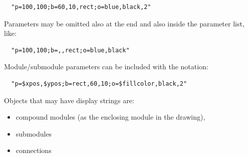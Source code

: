 \begin{verbatim}
  "p=100,100;b=60,10,rect;o=blue,black,2"
\end{verbatim}

Parameters may be omitted also at the end and also inside the
parameter list, like:

\begin{verbatim}
  "p=100,100;b=,,rect;o=blue,black"
\end{verbatim}

Module/submodule parameters can be included with the  notation:

\begin{verbatim}
  "p=$xpos,$ypos;b=rect,60,10;o=$fillcolor,black,2"
\end{verbatim}

Objects that may have display strings are:
\begin{itemize}
  \item{compound modules (as the enclosing module in the drawing),}
  \item{submodules}
  \item{connections}
\end{itemize}



